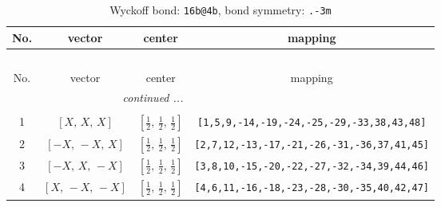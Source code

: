 \documentclass[fleqn,8pt]{jsarticle}
\begin{document}
\renewcommand{\arraystretch}{1.2}
\begin{longtable}{cccc}
\caption{Wyckoff bond: {\tt 16b@4b}, bond symmetry: {\tt .-3m}}
 \\
 \hline \hline
No. & vector & center & mapping \\ \hline \endfirsthead

\multicolumn{3}{l}{\tablename\ \thetable{}} \\
 \hline \hline
No. & vector & center & mapping \\ \hline \endhead

 \hline \hline
\multicolumn{3}{r}{\footnotesize\it continued ...} \\ \endfoot

 \hline \hline
\multicolumn{3}{r}{} \\ \endlastfoot

1 & $\left[ X,\, X,\, X \right]$ & $\left[ \frac{1}{2},\, \frac{1}{2},\, \frac{1}{2} \right]$ & {\tt [1,5,9,-14,-19,-24,-25,-29,-33,38,43,48]} \\ \hline
2 & $\left[ - X,\, - X,\, X \right]$ & $\left[ \frac{1}{2},\, \frac{1}{2},\, \frac{1}{2} \right]$ & {\tt [2,7,12,-13,-17,-21,-26,-31,-36,37,41,45]} \\ \hline
3 & $\left[ - X,\, X,\, - X \right]$ & $\left[ \frac{1}{2},\, \frac{1}{2},\, \frac{1}{2} \right]$ & {\tt [3,8,10,-15,-20,-22,-27,-32,-34,39,44,46]} \\ \hline
4 & $\left[ X,\, - X,\, - X \right]$ & $\left[ \frac{1}{2},\, \frac{1}{2},\, \frac{1}{2} \right]$ & {\tt [4,6,11,-16,-18,-23,-28,-30,-35,40,42,47]} \\
\end{longtable}
\renewcommand{\arraystretch}{1.2}
\end{document}
